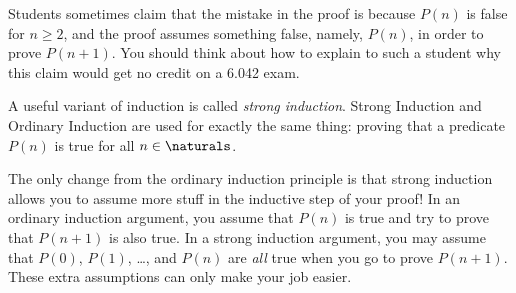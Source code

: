 \fi %

Students sometimes claim that the mistake in the proof is because $P(n)$
is false for $n \geq 2$, and the proof assumes something false, namely,
$P(n)$, in order to prove $P(n+1)$.  You should think about how to explain
to such a student why this claim would get no credit on a 6.042 exam.

\begin{problems}
\classproblems
{}
\end{problems}




A useful variant of induction is called {\em strong induction}.  Strong
Induction and Ordinary Induction are used for exactly the same thing:
proving that a predicate $P(n)$ is true for all $n \in \naturals$.


The only change from the ordinary induction principle is that strong
induction allows you to assume more stuff in the inductive step of your
proof!  In an ordinary induction argument, you assume that $P(n)$ is true
and try to prove that $P(n+1)$ is also true.  In a strong induction
argument, you may assume that $P(0)$, $P(1)$, \dots, and $P(n)$ are
\textit{all} true when you go to prove $P(n+1)$.  These extra assumptions
can only make your job easier.

